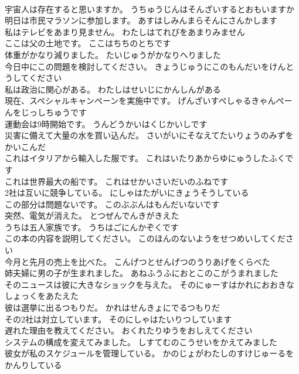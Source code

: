 \documentclass[8pt]{extreport}
\begin{document}
\begin{CJK}{UTF8}{min}
\\	宇宙人は存在すると思いますか。	うちゅうじんはそんざいするとおもいますか 
\\	明日は市民マラソンに参加します。	あすはしみんまらそんにさんかします 
\\	私はテレビをあまり見ません。	わたしはてれびをあまりみません 
\\	ここは父の土地です。	ここはちちのとちです 
\\	体重がかなり減りました。	たいじゅうがかなりへりました 
\\	今日中にこの問題を検討してください。	きょうじゅうにこのもんだいをけんとうしてください 
\\	私は政治に関心がある。	わたしはせいじにかんしんがある 
\\	現在、スペシャルキャンペーンを実施中です。	げんざいすぺしゃるきゃんぺーんをじっしちゅうです 
\\	運動会は9時開始です。	うんどうかいはくじかいしです 
\\	災害に備えて大量の水を買い込んだ。	さいがいにそなえてたいりょうのみずをかいこんだ 
\\	これはイタリアから輸入した服です。	これはいたりあからゆにゅうしたふくです 
\\	これは世界最大の船です。	これはせかいさいだいのふねです 
\\	2社は互いに競争している。	にしゃはたがいにきょうそうしている 
\\	この部分は問題ないです。	このぶぶんはもんだいないです 
\\	突然、電気が消えた。	とつぜんでんきがきえた 
\\	うちは五人家族です。	うちはごにんかぞくです 
\\	この本の内容を説明してください。	このほんのないようをせつめいしてください 
\\	今月と先月の売上を比べた。	こんげつとせんげつのうりあげをくらべた 
\\	姉夫婦に男の子が生まれました。	あねふうふにおとこのこがうまれました 
\\	そのニュースは彼に大きなショックを与えた。	そのにゅーすはかれにおおきなしょっくをあたえた 
\\	彼は選挙に出るつもりだ。	かれはせんきょにでるつもりだ 
\\	その2社は対立しています。	そのにしゃはたいりつしています 
\\	遅れた理由を教えてください。	おくれたりゆうをおしえてください 
\\	システムの構成を変えてみました。	しすてむのこうせいをかえてみました 
\\	彼女が私のスケジュールを管理している。	かのじょがわたしのすけじゅーるをかんりしている 

\end{CJK}
\end{document}
